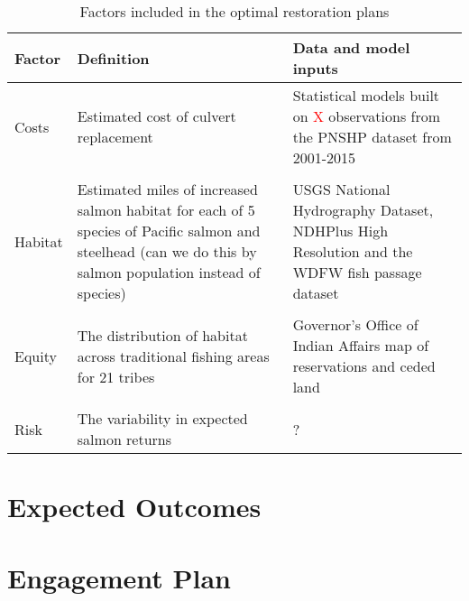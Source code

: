 \documentclass[12pt]{elsarticle}
\begin{document}
\begin{table}[htbp]
  \centering
  \caption{Factors included in the optimal restoration plans}
    \begin{tabular}{llp{18.835em}}\hline
    \textbf{Factor} & \textbf{Definition} & \multicolumn{1}{l}{\textbf{Data and model inputs}} \\\hline
    Costs & Estimated cost of culvert replacement & Statistical models built on \textcolor{red}{X} observations from the PNSHP dataset from 2001-2015 \\
& &\\
    Habitat & \multicolumn{1}{p{17.335em}}{Estimated miles of increased salmon habitat for each of 5 species of Pacific salmon and steelhead (can we do this by salmon population instead of species)} & USGS National Hydrography Dataset, NDHPlus High Resolution and the WDFW fish passage dataset \\
& &\\
    Equity & \multicolumn{1}{p{17.335em}}{The distribution of habitat across traditional fishing areas for 21 tribes} & Governor's Office of Indian Affairs map of reservations and ceded land \\
& &\\
    Risk  & The variability in expected salmon returns & ? \\\hline
    \end{tabular}%
  \label{tab:factors}%
\end{table}%





\section{Expected Outcomes}
% 

\section{Engagement Plan}
\end{document}
